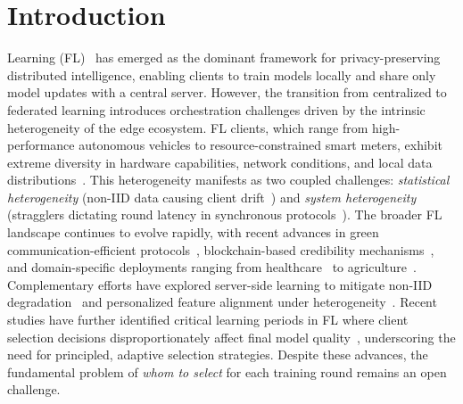 \documentclass[journal]{IEEEtran}
\begin{document}
\section{Introduction}

 Learning (FL)~\cite{mcmahan2017communication} has emerged as the dominant framework for privacy-preserving distributed intelligence, enabling clients to train models locally and share only model updates with a central server. However, the transition from centralized to federated learning introduces orchestration challenges driven by the intrinsic heterogeneity of the edge ecosystem. FL clients, which range from high-performance autonomous vehicles to resource-constrained smart meters, exhibit extreme diversity in hardware capabilities, network conditions, and local data distributions~\cite{li2020federated, nguyen2021federated, lim2020federated}. This heterogeneity manifests as two coupled challenges: \textit{statistical heterogeneity} (non-IID data causing client drift~\cite{karimireddy2020scaffold}) and \textit{system heterogeneity} (stragglers dictating round latency in synchronous protocols~\cite{li2020federated}). The broader FL landscape continues to evolve rapidly, with recent advances in green communication-efficient protocols~\cite{thakur2025grace, thakur2025greensurvey}, blockchain-based credibility mechanisms~\cite{chen2025credible}, and domain-specific deployments ranging from healthcare~\cite{ahmed2026secure} to agriculture~\cite{dey2025flyer}. Complementary efforts have explored server-side learning to mitigate non-IID degradation~\cite{mai2024study} and personalized feature alignment under heterogeneity~\cite{xu2023fedpac}. Recent studies have further identified critical learning periods in FL where client selection decisions disproportionately affect final model quality~\cite{yan2023criticalfl}, underscoring the need for principled, adaptive selection strategies. Despite these advances, the fundamental problem of \textit{whom to select} for each training round remains an open challenge.
\end{document}
